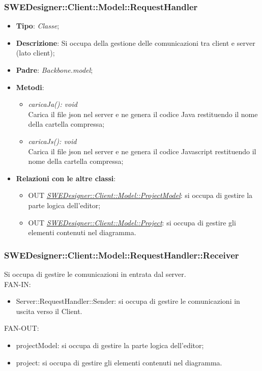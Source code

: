 \documentclass[../DefinizioneDiProdotto.tex]{subfiles}
\begin{document}
				\subsubsection{SWEDesigner::Client::Model::RequestHandler}
				\hypertarget{SWEDesigner::Client::Model::RequestHandler}{}
					\begin{itemize}
						\item \textbf{Tipo}: \emph{Classe};
						\item \textbf{Descrizione}: Si occupa della gestione delle comunicazioni tra client e server (lato client);
						\item \textbf{Padre}: \emph{Backbone.model};
						\item \textbf{Metodi}:
						\begin{itemize}
							\item \emph{caricaJa(): void} \\
							Carica il file json nel server e ne genera il codice Java restituendo il nome della cartella compressa; \\
							\item \emph{caricaJs(): void} \\
							Carica il file json nel server e ne genera il codice Javascript restituendo il nome della cartella compressa; \\
						\end{itemize}
						\item \textbf{Relazioni con le altre classi}:
						\begin{itemize}
							\item OUT \hyperlink{SWEDesigner::Client::Model::ProjectModel}{\emph{SWEDesigner::Client::Model::ProjectModel}}: si occupa di gestire la parte logica dell'editor;
							\item OUT \hyperlink{SWEDesigner::Client::Model::Project}{\emph{SWEDesigner::Client::Model::Project}}: si occupa di gestire gli elementi contenuti nel diagramma.
						\end{itemize}
					\end{itemize}

				\subsubsection{SWEDesigner::Client::Model::RequestHandler::Receiver}
				Si occupa di gestire le comunicazioni in entrata dal server.\\
					FAN-IN:
					\begin{itemize}
						\item Server::RequestHandler::Sender: si occupa di gestire le comunicazioni in uscita verso il Client.
					\end{itemize}
					FAN-OUT:
					\begin{itemize}
						\item projectModel: si occupa di gestire la parte logica dell'editor;
						\item project: si occupa di gestire gli elementi contenuti nel diagramma.
					\end{itemize}
		
\end{document}
